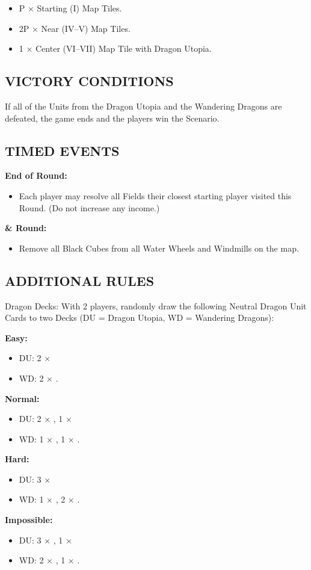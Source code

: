 \begin{multicols*}{2}
\begin{itemize}
  \item P × Starting (I) Map Tiles.
  \item 2P × Near (IV–V) Map Tiles.
  \item 1 × Center (VI–VII) Map Tile with Dragon Utopia.
\end{itemize}

\subsection*{\MakeUppercase{Victory Conditions}}
If all of the Units from the Dragon Utopia and the Wandering Dragons are defeated, the game ends and the players win the Scenario.

\subsection*{\MakeUppercase{Timed Events}}
\textbf{End of  Round:}
\begin{itemize}
  \item Each player may resolve all Fields their closest starting player visited this Round. (Do not increase any income.)
\end{itemize}
\textbf{ \&  Round:}
\begin{itemize}
  \item Remove all Black Cubes from all Water Wheels and Windmills on the map.
\end{itemize}

\subsection*{\MakeUppercase{Additional Rules}}
Dragon Decks: With 2 players, randomly draw the following Neutral Dragon Unit Cards to two Decks (DU = Dragon Utopia, WD = Wandering Dragons):

\textbf{Easy:}
\begin{itemize}
  \item DU: 2 × \azure\
  \item WD: 2 × \golden.
\end{itemize}
\textbf{Normal:}
\begin{itemize}
  \item DU: 2 × \azure, 1 × \golden\
  \item WD: 1 × \azure, 1 × \golden.
\end{itemize}
\textbf{Hard:}
\begin{itemize}
  \item DU: 3 × \azure\
  \item WD: 1 × \azure, 2 × \golden.
\end{itemize}
\textbf{Impossible:}
\begin{itemize}
  \item DU: 3 × \azure, 1 × \golden\
  \item WD: 2 × \azure, 1 × \golden.
\end{itemize}


\end{multicols*}
